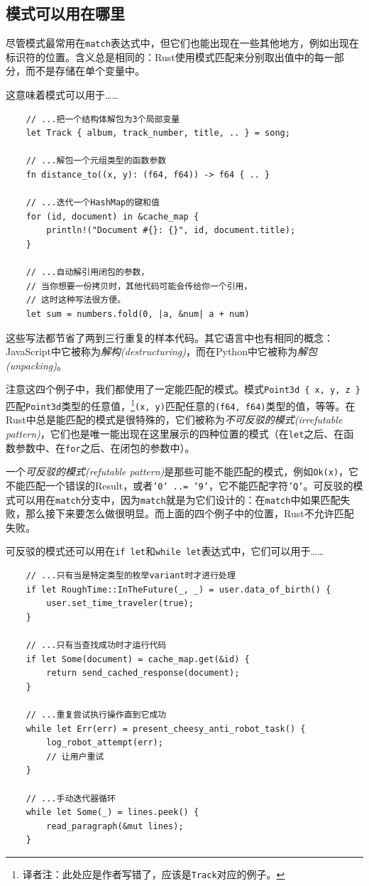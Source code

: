 \subsection{模式可以用在哪里}
尽管模式最常用在\texttt{match}表达式中，但它们也能出现在一些其他地方，例如出现在标识符的位置。含义总是相同的：Rust使用模式匹配来分别取出值中的每一部分，而不是存储在单个变量中。

这意味着模式可以用于……
\begin{verbatim}
    // ...把一个结构体解包为3个局部变量
    let Track { album, track_number, title, .. } = song;

    // ...解包一个元组类型的函数参数
    fn distance_to((x, y): (f64, f64)) -> f64 { .. }

    // ...迭代一个HashMap的键和值
    for (id, document) in &cache_map {
        println!("Document #{}: {}", id, document.title);
    }

    // ...自动解引用闭包的参数，
    // 当你想要一份拷贝时，其他代码可能会传给你一个引用，
    // 这时这种写法很方便。
    let sum = numbers.fold(0, |a, &num| a + num)
\end{verbatim}

这些写法都节省了两到三行重复的样本代码。其它语言中也有相同的概念：JavaScript中它被称为\emph{解构(destructuring)}，而在Python中它被称为\emph{解包(unpacking)}。

注意这四个例子中，我们都使用了一定能匹配的模式。模式\texttt{Point3d \{ x, y, z \}}匹配\texttt{Point3d}类型的任意值，\footnote{译者注：此处应是作者写错了，应该是\texttt{Track}对应的例子。}\texttt{(x, y)}匹配任意的\texttt{(f64, f64)}类型的值，等等。在Rust中总是能匹配的模式是很特殊的，它们被称为\emph{不可反驳的模式(irrefutable pattern)}，它们也是唯一能出现在这里展示的四种位置的模式（在\texttt{let}之后、在函数参数中、在\texttt{for}之后、在闭包的参数中）。

一个\emph{可反驳的模式(refutable pattern)}是那些可能不能匹配的模式，例如\texttt{Ok(x)}，它不能匹配一个错误的Result，或者\texttt{'0' ..= '9'}，它不能匹配字符\texttt{'Q'}。可反驳的模式可以用在\texttt{match}分支中，因为\texttt{match}就是为它们设计的：在\texttt{match}中如果匹配失败，那么接下来要怎么做很明显。而上面的四个例子中的位置，Rust不允许匹配失败。

可反驳的模式还可以用在\texttt{if let}和\texttt{while let}表达式中，它们可以用于……
\begin{verbatim}
    // ...只有当是特定类型的枚举variant时才进行处理
    if let RoughTime::InTheFuture(_, _) = user.data_of_birth() {
        user.set_time_traveler(true);
    }

    // ...只有当查找成功时才运行代码
    if let Some(document) = cache_map.get(&id) {
        return send_cached_response(document);
    }

    // ...重复尝试执行操作直到它成功
    while let Err(err) = present_cheesy_anti_robot_task() {
        log_robot_attempt(err);
        // 让用户重试
    }

    // ...手动迭代器循环
    while let Some(_) = lines.peek() {
        read_paragraph(&mut lines);
    }
\end{verbatim}

